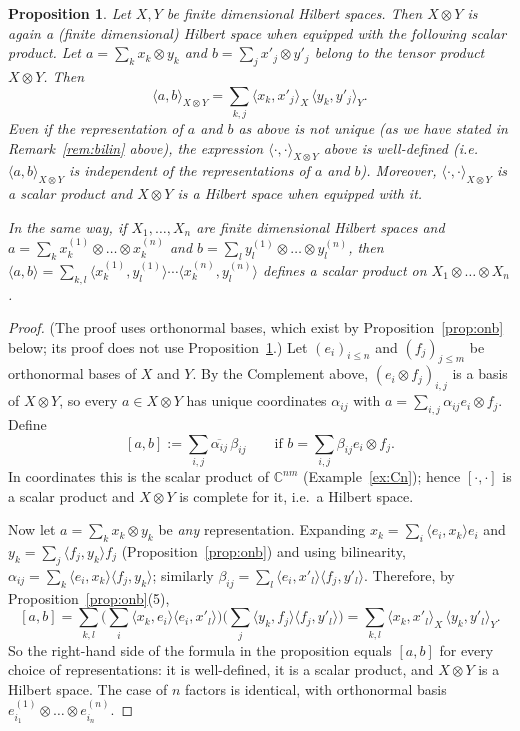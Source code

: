 \documentclass[11pt,a4paper]{article}
\numberwithin{equation}{section}
\newcommand{\C}{\mathbb{C}}
\newcommand{\ip}[2]{\langle #1, #2\rangle}
\newcommand{\conj}[1]{\overline{#1}}
\theoremstyle{plain}
\newtheorem{proposition}[theorem]{Proposition}
\theoremstyle{definition}
\theoremstyle{plain}
\theoremstyle{definition}
\begin{document}
\begin{proposition}\label{prop:tensorsp}
Let $X,Y$ be finite dimensional Hilbert spaces. Then $X\otimes Y$ is again a (finite
dimensional) Hilbert space when equipped with the following scalar product. Let
$a=\sum_kx_k\otimes y_k$ and $b=\sum_jx'_j\otimes y'_j$ belong to the tensor product
$X\otimes Y$. Then
\[
\ip{a}{b}_{X\otimes Y}=\sum_{k,j}\ip{x_k}{x'_j}_X\,\ip{y_k}{y'_j}_Y .
\]
Even if the representation of $a$ and $b$ as above is not unique (as we have stated in
Remark~\ref{rem:bilin} above), the expression $\ip{\cdot}{\cdot}_{X\otimes Y}$ above is
well-defined (i.e.\ $\ip{a}{b}_{X\otimes Y}$ is independent of the representations of $a$
and $b$). Moreover, $\ip{\cdot}{\cdot}_{X\otimes Y}$ is a scalar product and $X\otimes Y$
is a Hilbert space when equipped with it.

In the same way, if $X_1,\dots,X_n$ are finite dimensional Hilbert spaces and
$a=\sum_kx_k^{(1)}\otimes\dots\otimes x_k^{(n)}$ and
$b=\sum_ly_l^{(1)}\otimes\dots\otimes y_l^{(n)}$, then
$\ip{a}{b}=\sum_{k,l}\ip{x_k^{(1)}}{y_l^{(1)}}\cdots\ip{x_k^{(n)}}{y_l^{(n)}}$ defines a scalar
product on $X_1\otimes\dots\otimes X_n$.
\end{proposition}
\begin{proof}
(The proof uses orthonormal bases, which exist by Proposition~\ref{prop:onb} below; its
proof does not use Proposition~\ref{prop:tensorsp}.) Let $(e_i)_{i\le n}$ and
$(f_j)_{j\le m}$ be orthonormal bases of $X$ and $Y$. By the Complement above,
$(e_i\otimes f_j)_{i,j}$ is a basis of $X\otimes Y$, so every $a\in X\otimes Y$ has unique
coordinates $\alpha_{ij}$ with $a=\sum_{i,j}\alpha_{ij}e_i\otimes f_j$. Define
\[
[a,b]:=\sum_{i,j}\conj{\alpha_{ij}}\,\beta_{ij}\qquad\text{if }b=\sum_{i,j}\beta_{ij}e_i\otimes f_j .
\]
In coordinates this is the scalar product of $\C^{nm}$ (Example~\ref{ex:Cn}); hence
$[\cdot,\cdot]$ is a scalar product and $X\otimes Y$ is complete for it, i.e.\ a Hilbert
space.

Now let $a=\sum_kx_k\otimes y_k$ be \emph{any} representation. Expanding
$x_k=\sum_i\ip{e_i}{x_k}e_i$ and $y_k=\sum_j\ip{f_j}{y_k}f_j$ (Proposition~\ref{prop:onb})
and using bilinearity, $\alpha_{ij}=\sum_k\ip{e_i}{x_k}\ip{f_j}{y_k}$; similarly
$\beta_{ij}=\sum_l\ip{e_i}{x'_l}\ip{f_j}{y'_l}$. Therefore, by
Proposition~\ref{prop:onb}(5),
\[
[a,b]=\sum_{k,l}\Big(\sum_i\ip{x_k}{e_i}\ip{e_i}{x'_l}\Big)\Big(\sum_j\ip{y_k}{f_j}\ip{f_j}{y'_l}\Big)
=\sum_{k,l}\ip{x_k}{x'_l}_X\,\ip{y_k}{y'_l}_Y .
\]
So the right-hand side of the formula in the proposition equals $[a,b]$ for every choice
of representations: it is well-defined, it is a scalar product, and $X\otimes Y$ is a
Hilbert space. The case of $n$ factors is identical, with orthonormal basis
$e^{(1)}_{i_1}\otimes\dots\otimes e^{(n)}_{i_n}$.
\end{proof}
\end{document}
